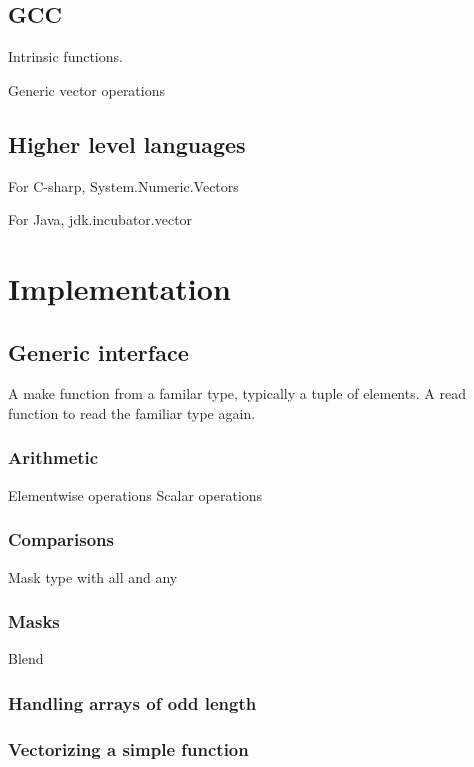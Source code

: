 \documentclass{article}
\begin{document}
\subsection{GCC}

Intrinsic functions.

Generic vector operations

\subsection{Higher level languages}

For C-sharp, System.Numeric.Vectors

For Java, jdk.incubator.vector


\section{Implementation}


\subsection{Generic interface}


A make function from a familar type, typically a tuple of elements.
A read function to read the familiar type again.


\subsubsection{Arithmetic}

Elementwise operations
Scalar operations

\subsubsection{Comparisons}

Mask type with all and any

\subsubsection{Masks}

Blend

\subsubsection{Handling arrays of odd length}






\subsubsection{Vectorizing a simple function}
\end{document}
